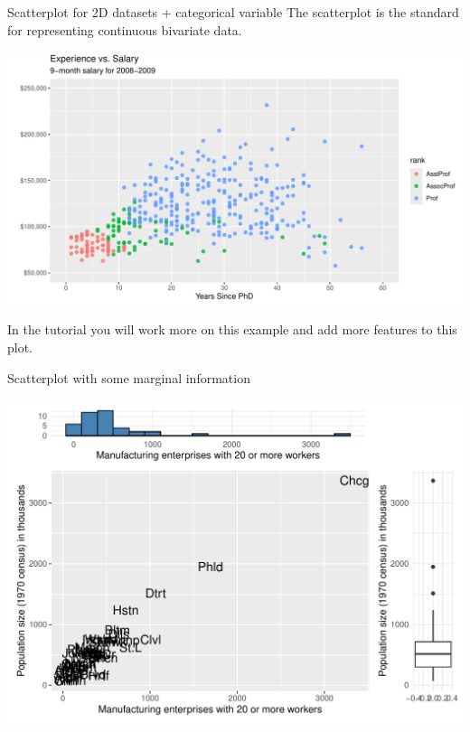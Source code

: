\documentclass[11pt,handout,aspectratio=169]{beamer}
\begin{document}
\begin{frame}[fragile]{Scatterplot for 2D datasets + categorical variable}
	The scatterplot is the standard for representing continuous bivariate data.
	{\scriptsize
\begin{center}
\includegraphics[width=.7\textwidth]{pics/plot1.2.pdf}		
\end{center}}
In the tutorial you will work more on this example and add more features to this plot.
\end{frame}

\begin{frame}[fragile]{Scatterplot with some marginal information}
\begin{center}
\includegraphics[width=.75\textwidth]{pics/plot1.3.pdf}		
\end{center}
\end{frame}
\end{document}
